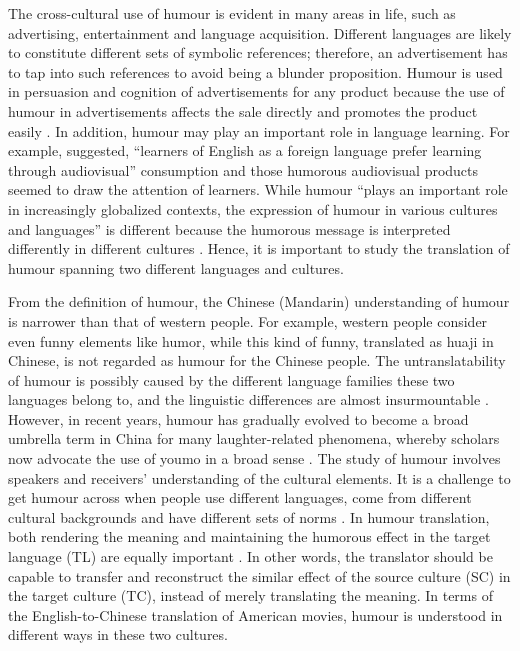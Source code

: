 \documentclass[english]{textolivre}
\begin{document}
The cross-cultural use of humour is evident in many areas in life, such as advertising, entertainment and language acquisition. Different languages are likely to constitute different sets of symbolic references; therefore, an advertisement has to tap into such references to avoid being a blunder proposition. \cite{amini_quality_2013} Humour is used in persuasion and cognition of advertisements for any product because the use of humour in advertisements affects the sale directly and promotes the product easily \cite{venkatesh_effectiveness_2015}. In addition, humour may play an important role in language learning. For example, \textcite[p. 122]{garcia-escribano_effects_2017} suggested, “learners of English as a foreign language prefer learning through audiovisual” consumption and those humorous audiovisual products seemed to draw the attention of learners. While humour “plays an important role in increasingly globalized contexts, the expression of humour in various cultures and languages” is different because the humorous message is interpreted differently in different cultures \cite[p. 183]{yap_secondary_2020}. Hence, it is important to study the translation of humour spanning two different languages and cultures.  

From the definition of humour, the Chinese (Mandarin) understanding of humour is narrower than that of western people. For example, western people consider even funny elements like humor, while this kind of funny, translated as huaji in Chinese, is not regarded as humour for the Chinese people. The untranslatability of humour is possibly caused by the different language families these two languages belong to, and the linguistic differences are almost insurmountable \cite{han_untranslatability_2011}. However, in recent years, humour has gradually evolved to become a broad umbrella term in China for many laughter-related phenomena, whereby scholars now advocate the use of youmo in a broad sense \cite{chen_sense_2013}. The study of humour involves speakers and receivers' understanding of the cultural elements. It is a challenge to get humour across when people use different languages, come from different cultural backgrounds and have different sets of norms \cite{lutviana_failure_2012}. In humour translation, both rendering the meaning and maintaining the humorous effect in the target language (TL) are equally important \cite{nufus_acceptability_2014}. In other words, the translator should be capable to transfer and reconstruct the similar effect of the source culture (SC) in the target culture (TC), instead of merely translating the meaning. In terms of the English-to-Chinese translation of American movies, humour is understood in different ways in these two cultures.
\end{document}
